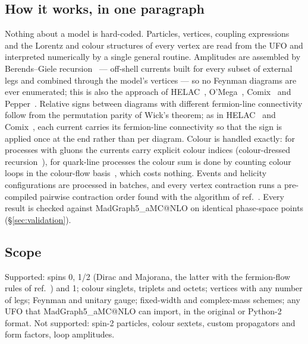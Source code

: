 \documentclass[11pt]{article}
\makeatletter
\newcommand{\mg}{MadGraph5\_aMC@NLO}
\makeatother
\begin{document}
\subsection{How it works, in one paragraph}
Nothing about a model is hard-coded. Particles, vertices, coupling expressions and the Lorentz and colour structures of every vertex are read from the UFO and interpreted numerically by a single general routine. Amplitudes are assembled by Berends--Giele recursion~\cite{Berends:1987me} --- off-shell currents built for every subset of external legs and combined through the model's vertices --- so no Feynman diagrams are ever enumerated; this is also the approach of HELAC~\cite{Kanaki:2000ey}, O'Mega~\cite{Moretti:2001zz}, Comix~\cite{Gleisberg:2008fv} and Pepper~\cite{Bothmann:2023gew}. Relative signs between diagrams with different fermion-line connectivity follow from the permutation parity of Wick's theorem; as in HELAC~\cite{Kanaki:2000ey} and Comix~\cite{Gleisberg:2008fv}, each current carries its fermion-line connectivity so that the sign is applied once at the end rather than per diagram. Colour is handled exactly: for processes with gluons the currents carry explicit colour indices (colour-dressed recursion~\cite{Duhr:2006iq}), for quark-line processes the colour sum is done by counting colour loops in the colour-flow basis~\cite{Maltoni:2002mq}, which costs nothing. Events and helicity configurations are processed in batches, and every vertex contraction runs a pre-compiled pairwise contraction order found with the algorithm of ref.~\cite{Smith:2018opt}. Every result is checked against \mg{} on identical phase-space points (\S\ref{sec:validation}).

\subsection{Scope}
Supported: spins 0, 1/2 (Dirac and Majorana, the latter with the fermion-flow rules of ref.~\cite{Denner:1992vza}) and 1; colour singlets, triplets and octets; vertices with any number of legs; Feynman and unitary gauge; fixed-width and complex-mass schemes; any UFO that \mg{} can import, in the original or Python-2 format. Not supported: spin-2 particles, colour sextets, custom propagators and form factors, loop amplitudes.

\end{document}
